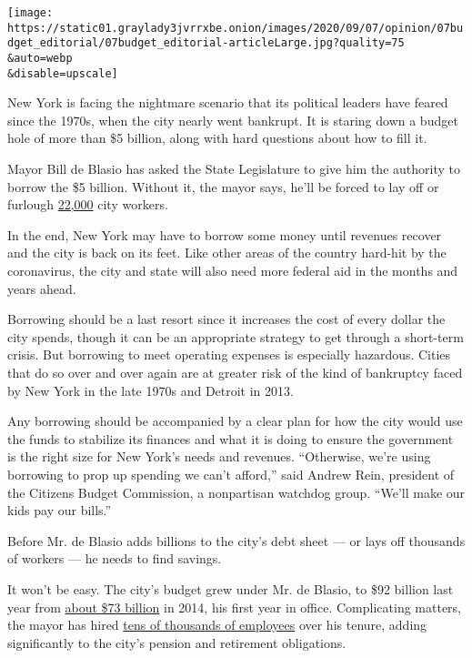 \texttt{[image: https://static01.graylady3jvrrxbe.onion/images/2020/09/07/opinion/07budget\_editorial/07budget\_editorial-articleLarge.jpg?quality=75\\\&auto=webp\\\&disable=upscale]}

New York is facing the nightmare scenario that its political leaders
have feared since the 1970s, when the city nearly went bankrupt. It is
staring down a budget hole of more than \$5 billion, along with hard
questions about how to fill it.

Mayor Bill de Blasio has asked the State Legislature to give him the
authority to borrow the \$5 billion. Without it, the mayor says, he'll
be forced to lay off or furlough
\href{https://www.nytimes3xbfgragh.onion/2020/06/24/nyregion/budget-layoffs-nyc-mta-coronavirus.html}{22,000}
city workers.

In the end, New York may have to borrow some money until revenues
recover and the city is back on its feet. Like other areas of the
country hard-hit by the coronavirus, the city and state will also need
more federal aid in the months and years ahead.

Borrowing should be a last resort since it increases the cost of every
dollar the city spends, though it can be an appropriate strategy to get
through a short-term crisis. But borrowing to meet operating expenses is
especially hazardous. Cities that do so over and over again are at
greater risk of the kind of bankruptcy faced by New York in the late
1970s and Detroit in 2013.

Any borrowing should be accompanied by a clear plan for how the city
would use the funds to stabilize its finances and what it is doing to
ensure the government is the right size for New York's needs and
revenues. ``Otherwise, we're using borrowing to prop up spending we
can't afford,'' said Andrew Rein, president of the Citizens Budget
Commission, a nonpartisan watchdog group. ``We'll make our kids pay our
bills.''

Before Mr. de Blasio adds billions to the city's debt sheet --- or lays
off thousands of workers --- he needs to find savings.

It won't be easy. The city's budget grew under Mr. de Blasio, to \$92
billion last year from
\href{https://ibo.nyc.ny.us/RevenueSpending/citywide-summary.html}{about
\$73 billion} in 2014, his first year in office. Complicating matters,
the mayor has hired
\href{https://www.nytimes3xbfgragh.onion/2017/06/15/nyregion/high-number-city-employees-bill-deblasio.html}{tens
of thousands of employees} over his tenure, adding significantly to the
city's pension and retirement obligations.

